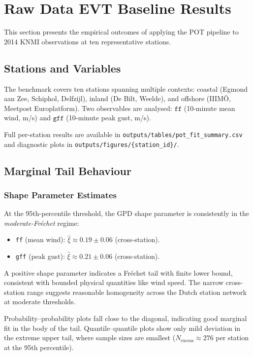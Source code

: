 \section{Raw Data EVT Baseline Results}

This section presents the empirical outcomes of applying the POT pipeline to 2014 KNMI observations at ten representative stations.

\subsection{Stations and Variables}

The benchmark covers ten stations spanning multiple contexts: coastal (Egmond aan Zee, Schiphol, Delfzijl), inland (De Bilt, Weelde), and offshore (IIIMÖ, Meetpost Europlatform). Two observables are analysed: $\texttt{ff}$ (10-minute mean wind, m/s) and $\texttt{gff}$ (10-minute peak gust, m/s).

Full per-station results are available in \texttt{outputs/tables/pot\_fit\_summary.csv} and diagnostic plots in \texttt{outputs/figures/\{station\_id\}/}.

\subsection{Marginal Tail Behaviour}

\subsubsection{Shape Parameter Estimates}

At the 95th-percentile threshold, the GPD shape parameter is consistently in the \emph{moderate-Fréchet} regime:
\begin{itemize}
    \item \texttt{ff} (mean wind): $\hat{\xi} \approx 0.19 \pm 0.06$ (cross-station).
    \item \texttt{gff} (peak gust): $\hat{\xi} \approx 0.21 \pm 0.06$ (cross-station).
\end{itemize}

A positive shape parameter indicates a Fréchet tail with finite lower bound, consistent with bounded physical quantities like wind speed. The narrow cross-station range suggests reasonable homogeneity across the Dutch station network at moderate thresholds.

Probability--probability plots fall close to the diagonal, indicating good marginal fit in the body of the tail. Quantile--quantile plots show only mild deviation in the extreme upper tail, where sample sizes are smallest ($N_{\text{excess}} \approx 276$ per station at the 95th percentile).

